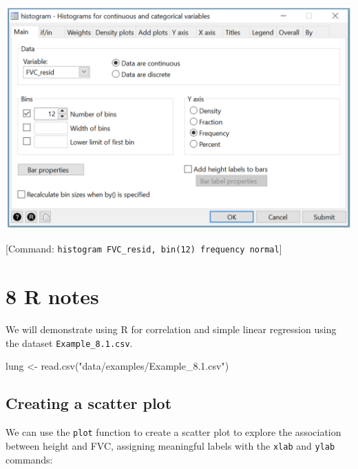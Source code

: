 \documentclass[
]{memoir}
\newenvironment{Shaded}{\begin{snugshade}}{\end{snugshade}}
\newcommand{\AttributeTok}[1]{\textcolor[rgb]{0.77,0.63,0.00}{#1}}
\newcommand{\FunctionTok}[1]{\textcolor[rgb]{0.00,0.00,0.00}{#1}}
\newcommand{\NormalTok}[1]{#1}
\newcommand{\OtherTok}[1]{\textcolor[rgb]{0.56,0.35,0.01}{#1}}
\newcommand{\SpecialCharTok}[1]{\textcolor[rgb]{0.00,0.00,0.00}{#1}}
\newcommand{\StringTok}[1]{\textcolor[rgb]{0.31,0.60,0.02}{#1}}
\begin{document}
\includegraphics[width=0.66\linewidth]{img/mod08/stata/postest-3}

{[}Command: \texttt{histogram\ FVC\_resid,\ bin(12)\ frequency\ normal}{]}

\hypertarget{r-notes}{%
\chapter*{\texorpdfstring{\textbf{8} R notes}{8 R notes}}\label{r-notes}}

We will demonstrate using R for correlation and simple linear regression using the dataset \texttt{Example\_8.1.csv}.

\begin{Shaded}
\begin{Highlighting}[]
\NormalTok{lung }\OtherTok{\textless{}{-}} \FunctionTok{read.csv}\NormalTok{(}\StringTok{"data/examples/Example\_8.1.csv"}\NormalTok{)}
\end{Highlighting}
\end{Shaded}

\hypertarget{creating-a-scatter-plot-1}{%
\section{Creating a scatter plot}\label{creating-a-scatter-plot-1}}

We can use the \texttt{plot} function to create a scatter plot to explore the association between height and FVC, assigning meaningful labels with the \texttt{xlab} and \texttt{ylab} commands:

\begin{Shaded}
\end{Shaded}
\end{document}
